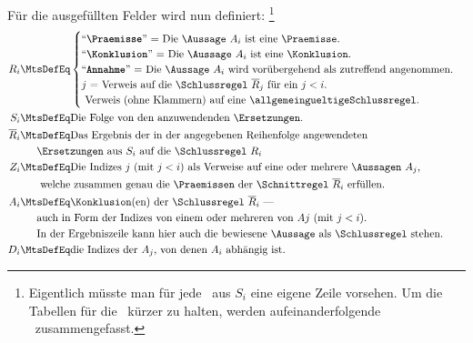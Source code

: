 Für die ausgefüllten Felder wird nun definiert:%
\footnote{%
	Eigentlich müsste man für jede \Ersetzung\ aus $S_i$ eine eigene Zeile vorsehen.
	Um die Tabellen für die \Beweise\ kürzer zu halten, werden aufeinanderfolgende \Ersetzungen\ zusammengefasst.
}
\begin{align}
	R_i & \MtsDefEq
	\begin{cases}
		\text{\strqt{\Praemisse}  = Die \Aussage\ $A_i$ ist eine \Praemisse.}\\
		\text{\strqt{\Konklusion} = Die \Aussage\ $A_i$ ist eine \Konklusion.}\\
		\text{\strqt{Annahme}     = Die \Aussage\ $A_i$ wird vorübergehend als zutreffend angenommen.}\\
		\text{$j$                 = Verweis auf die \Schlussregel\ $\overline{R}_j$ für ein $j < i$.}\\
		\text{                      Verweis (ohne Klammern) auf eine \allgemeingueltigeSchlussregel.}
	\end{cases}
	\\
	S_i & \MtsDefEq \text{Die Folge von den anzuwendenden \Ersetzungen.}
	\\
	\overline{R}_i & \MtsDefEq \text{Das Ergebnis der in der angegebenen Reihenfolge angewendeten}\\
	& \quad\;\; \text{\Ersetzungen\ aus $S_i$ auf die \Schlussregel\ $R_i$}
	\\
	Z_i & \MtsDefEq \text{Die Indizes $j$ (mit $j < i$) als Verweise auf eine oder mehrere \Aussagen\ $A_j$,}\\
	& \quad\;\;\text{ welche zusammen genau die \Praemissen\ der \Schnittregel\ } \overline{R}_i \text{ erfüllen.}
	\\
	A_i & \MtsDefEq \text{\Konklusion(en) der \Schlussregel\ $\overline{R}_i$ ---}\\
	& \quad\;\; \text{auch in Form der Indizes von einem oder mehreren von $Aj$ (mit $j < i$).}\\
	& \quad\;\; \text{In der Ergebniszeile kann hier auch die bewiesene \Aussage\ als \Schlussregel\ stehen.}
	\\
	D_i & \MtsDefEq \text{die Indizes der $A_j$, von denen $A_i$ abhängig ist.}
\end{align}

